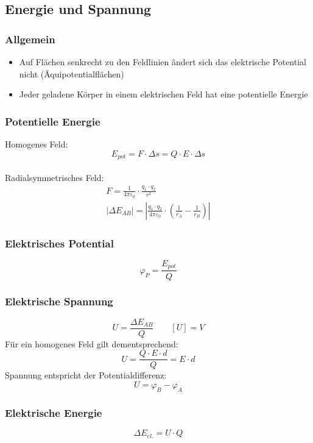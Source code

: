 \documentclass[12pt,a4paper,titlepage]{article}
\begin{document}
		\subsection{Energie und Spannung}
			\subsubsection{Allgemein}			
			\begin{itemize}
				\item Auf Flächen senkrecht zu den Feldlinien ändert sich das elektrische Potential nicht (Äquipotentialflächen)
				\item Jeder geladene Körper in einem elektrischen Feld hat eine potentielle Energie
			\end{itemize}
			\subsubsection{Potentielle Energie}
				Homogenes Feld: \\
				$$E_{pot} = F \cdot \Delta s = Q \cdot E \cdot \Delta s$$ \\
				Radialsymmetrisches Feld: \\
				\begin{gather*}
					F = \frac{1}{4\pi\varepsilon_0} \cdot \frac{q_1 \cdot q_2}{r^2} \\
					\left| \Delta E_{AB} \right| = \left| \frac{q_1 \cdot q_2}{4\pi\varepsilon_0} \cdot (\frac{1}{r_A}-\frac{1}{r_B}) \right|
				\end{gather*}
			\subsubsection{Elektrisches Potential}
				$$\varphi_P = \frac{E_{pot}}{Q}$$
			\subsubsection{Elektrische Spannung}
				$$U = \frac{\Delta E_{AB}}{Q} \qquad [U] = V$$
				Für ein homogenes Feld gilt dementsprechend: \\
				$$U = \frac{Q \cdot E \cdot d}{Q} = E \cdot d$$
				Spannung entspricht der Potentialdifferenz: \\
				$$U = \varphi_B - \varphi_A$$
			\subsubsection{Elektrische Energie}
				$$\Delta E_{el.} = U \cdot Q$$
\end{document}
